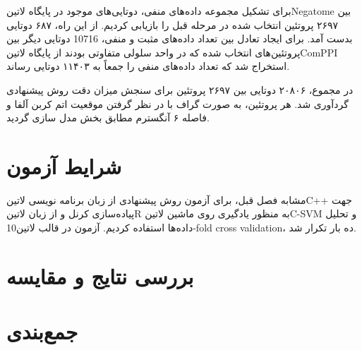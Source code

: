 برای تشکیل مجموعه داده‌های منفی، دوتایی‌های موجود در پایگاه ‌لاتین{Negatome} بین ۲۶۹۷ پروتئین انتخاب شده در مرحله قبل را بازیابی کردیم. از این راه، ۶۸۷ دوتایی بدست آمد. برای ایجاد تعادل بین تعداد داده‌های مثبت و منفی، 10716 دوتایی دیگر بین پروتئین‌های انتخاب شده که در واحد سلولی متفاوتی بودند از پایگاه ‌لاتین{ComPPI} استخراج شد که تعداد داده‌های منفی را جمعاً به ۱۱۴۰۳ دوتایی رساند.

در مجموع، ۲۰۸۰۶ دوتایی بین ۲۶۹۷ پروتئین برای سنجش میزان دقت روش پیشنهادی گردآوری شد. هر پروتئین، به صورت گراف با در نظر گرفتن موقعیت اتم کربن آلفا و فاصله ۶ آنگسترم مطابق بخش  مدل سازی گردید.

\section{شرایط آزمون}
مشابه فصل قبل، برای آزمون روش پیشنهادی از زبان برنامه نویسی ‌لاتین{C++} جهت پیاده‌سازی کرنل‌ و از زبان ‌لاتین{R} به منظور یادگیری روی ماشین ‌لاتین{C-SVM} و تحلیل داده‌ها استفاده کردیم. آزمون در قالب ‌لاتین{10-fold cross validation}، ده بار تکرار شد.

\section{بررسی نتایج و مقایسه}

\section{جمع‌بندی}